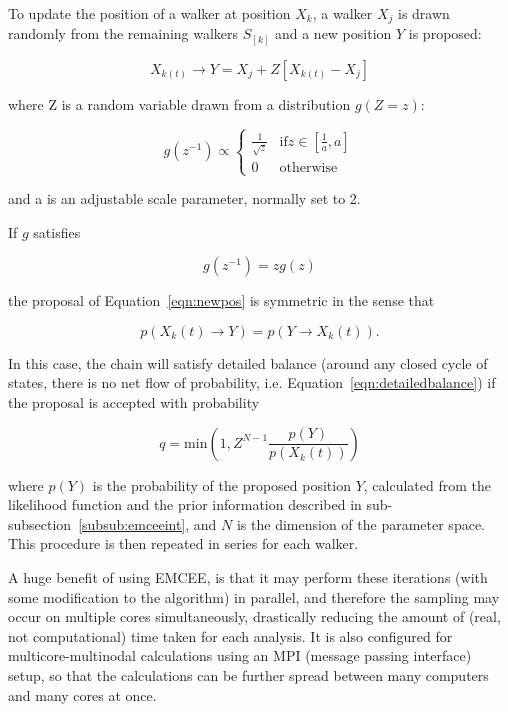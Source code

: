 \documentclass[11pt, a4paper,titlepage]{report}
\begin{document}
To update the position of a walker at position $X_k$, a walker $X_j$ is drawn randomly from the remaining walkers $S_{[k]}$ and a new position $Y$ is proposed:

\begin{equation} \label{eqn:newpos}
X_{k(t)} \to Y = X_j + Z [X_{k(t)} - X_j]
\end{equation}

where Z is a random variable drawn from a distribution $g(Z = z)$:

\[g(z^{-1}) \propto \left\{
  \begin{array}{lr}
    \frac{1}{\sqrt{z}} & \mathrm{if} z \in \left[\frac{1}{a}, a \right]\\
    0 & \mathrm{otherwise}
  \end{array}
\right.
\]

and a is an adjustable scale parameter, normally set to 2. 

If $g$ satisfies

\begin{equation}
g(z^{-1}) = z g(z)
\end{equation}

the proposal of Equation~\ref{eqn:newpos} is symmetric in the sense that

\begin{equation} \label{eqn:detailedbalance}
p(X_{k}(t) \to Y) = p(Y \to X_{k}(t)).
\end{equation}

In this case, the chain will satisfy detailed balance (around any closed cycle of states, there is no net flow of probability, i.e. Equation~\ref{eqn:detailedbalance})
if the proposal is accepted with probability 

\begin{equation}
q = \mathrm{min} \left(1, Z^{N-1} \frac{p(Y)}{p(X_k (t))} \right)
\end{equation}

where $p(Y)$ is the probability of the proposed position $Y$, calculated from the likelihood function and the prior information described in sub-subsection~\ref{subsub:emceeint}, and $N$ is the dimension of the parameter space. This procedure is then repeated in series for each walker.

A huge benefit of using EMCEE, is that it may perform these iterations (with some modification to the algorithm) in parallel, and therefore the sampling may occur on multiple cores simultaneously, drastically reducing the amount of (real, not computational) time taken for each analysis. It is also configured for multicore-multinodal calculations using an MPI (message passing interface) setup, so that the calculations can be further spread between many computers and many cores at once.  
\end{document}
